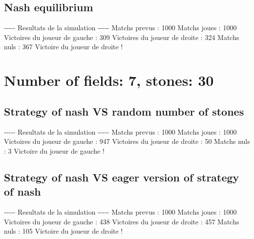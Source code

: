 \documentclass{article}%
\begin{document}
%
\subsection{Nash equilibrium}%
\label{subsec:Nash equilibrium}%
{-}{-}{-}{-}{-} Resultats de la simulation {-}{-}{-}{-}{-}\newline%
		\newline%
Matchs prevus : 1000\newline%
Matchs joues : 1000\newline%
\newline%
Victoires du joueur de gauche : 309\newline%
Victoires du joueur de droite : 324\newline%
Matchs nuls : 367\newline%
\newline%
Victoire du joueur de droite !

%
\section{Number of fields: 7, stones: 30}%
\label{sec:Number of fields 7, stones 30}%
\subsection{Strategy of nash VS random number of stones}%
\label{subsec:Strategy of nash VS random number of stones}%
{-}{-}{-}{-}{-} Resultats de la simulation {-}{-}{-}{-}{-}\newline%
		\newline%
Matchs prevus : 1000\newline%
Matchs joues : 1000\newline%
\newline%
Victoires du joueur de gauche : 947\newline%
Victoires du joueur de droite : 50\newline%
Matchs nuls : 3\newline%
\newline%
Victoire du joueur de gauche !

%
\subsection{Strategy of nash VS eager version of strategy of nash}%
\label{subsec:Strategy of nash VS eager version of strategy of nash}%
{-}{-}{-}{-}{-} Resultats de la simulation {-}{-}{-}{-}{-}\newline%
		\newline%
Matchs prevus : 1000\newline%
Matchs joues : 1000\newline%
\newline%
Victoires du joueur de gauche : 438\newline%
Victoires du joueur de droite : 457\newline%
Matchs nuls : 105\newline%
\newline%
Victoire du joueur de droite !
\end{document}
